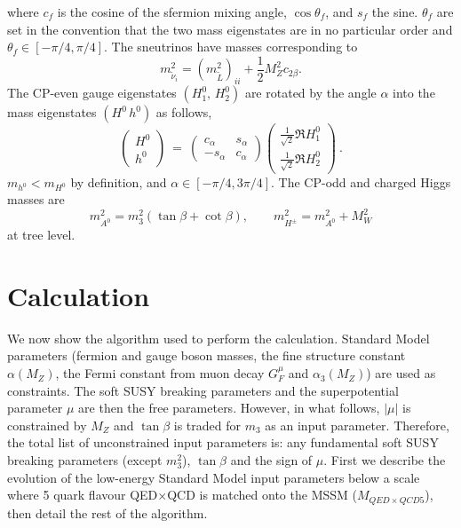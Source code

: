 \documentclass{article}
\def\half{\frac{1}{2}}
\begin{document}
%
where $c_f$ is the cosine of the sfermion mixing angle,
$\cos\theta_f$, and $s_f$ the sine. 
$\theta_f$ are set in the convention that the two mass eigenstates are in no
particular order and $\theta_f \in [-\pi/4, \pi/4]$. The sneutrinos have
masses corresponding to
\begin{equation}
m_{\tilde \nu_i}^2 = (m_{\tilde L}^2)_{ii} + \half M_Z^2 c_{2\beta}.
\end{equation}
The CP-even gauge eigenstates $(H_1^0,\, H_2^0)$ are rotated by the angle
$\alpha$ into the mass eigenstates $(H^0\, h^0)$ as follows,
%
\begin{equation}
\left(\begin{array}{c}H^0\\h^0\end{array}\right) \ =
\ \left(\begin{array}{cc} c_\alpha & s_\alpha\\-s_\alpha & c_\alpha
\end{array}\right)\left(\begin{array}{c} \frac{1}{\sqrt{2}} \Re  H_1^0
  \\\frac{1}{\sqrt{2}} \Re H_2^0\end{array}\right)~.
\label{rotateh}
\end{equation}
$m_{h^0} < m_{H^0}$ by
definition, and $\alpha \in [-\pi/4, 3 \pi/4]$.
The CP-odd and charged Higgs masses are
\begin{equation}
m_{A^0}^2 = m_3^2 (\tan \beta + \cot \beta),\qquad
m_{H^\pm}^2 = m_{A^0}^2 + M_W^2
\end{equation}
at tree level. 

\section{Calculation \label{sec:calculation}}

We now show the algorithm used to perform the calculation.
Standard Model parameters (fermion and gauge boson masses,
the fine structure constant $\alpha (M_Z)$, the Fermi constant from muon decay
$G_F^\mu$ and $\alpha_3(M_Z)$) are used as constraints. 
The soft SUSY breaking parameters and the superpotential parameter $\mu$ 
are then the free parameters. However, in what follows, $|\mu|$ is constrained
by $M_Z$ and $\tan \beta$ is traded for $m_3$ as an input parameter.
Therefore, the total list of unconstrained input parameters is: any
fundamental soft 
SUSY breaking parameters (except $m_3^2$), $\tan \beta$ and the sign
of $\mu$. 
First we describe the evolution of the low-energy Standard Model input
parameters below a scale where 5 quark flavour QED$\times$QCD is matched onto
the MSSM 
($M_{QED \times QCD5}$), then detail the rest of the algorithm.
\end{document}
